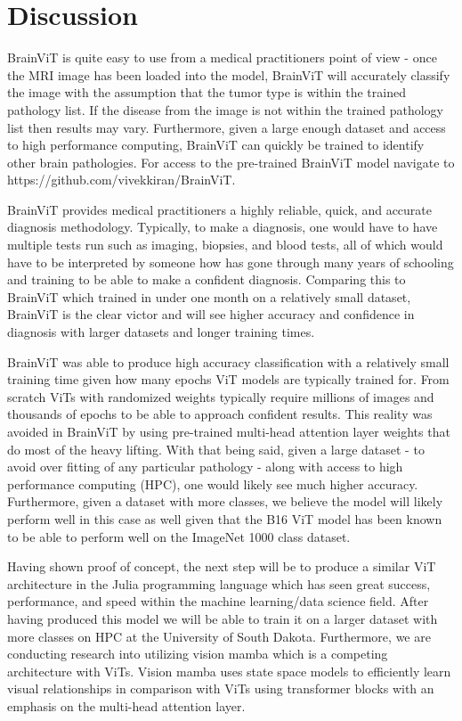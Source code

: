 \documentclass[conference]{IEEEtran}
\begin{document}
\section{Discussion}
BrainViT is quite easy to use from a medical practitioners point of view - once the MRI image has been loaded into the model, BrainViT will accurately classify the image with the assumption that the tumor type is within the trained pathology list. If the disease from the image is not within the trained pathology list then results may vary. Furthermore, given a large enough dataset and access to high performance computing, BrainViT can quickly be trained to identify other brain pathologies. For access to the pre-trained BrainViT model navigate to https://github.com/vivekkiran/BrainViT.

BrainViT provides medical practitioners a highly reliable, quick, and accurate diagnosis methodology. Typically, to make a diagnosis, one would have to have multiple tests run such as imaging, biopsies, and blood tests, all of which would have to be interpreted by someone how has gone through many years of schooling and training to be able to make a confident diagnosis. Comparing this to BrainViT which trained in under one month on a relatively small dataset, BrainViT is the clear victor and will see higher accuracy and confidence in diagnosis with larger datasets and longer training times.

BrainViT was able to produce high accuracy classification with a relatively small training time given how many epochs ViT models are typically trained for. From scratch ViTs with randomized weights typically require millions of images and thousands of epochs to be able to approach confident results. This reality was avoided in BrainViT by using pre-trained multi-head attention layer weights that do most of the heavy lifting. With that being said, given a large dataset - to avoid over fitting of any particular pathology - along with access to high performance computing (HPC), one would likely see much higher accuracy. Furthermore, given a dataset with more classes, we believe the model will likely perform well in this case as well given that the B16 ViT model has been known to be able to perform well on the ImageNet 1000 class dataset.

Having shown proof of concept, the next step will be to produce a similar ViT architecture in the Julia programming language which has seen great success, performance, and speed within the machine learning/data science field. After having produced this model we will be able to train it on a larger dataset with more classes on HPC at the University of South Dakota. Furthermore, we are conducting research into utilizing vision mamba which is a competing architecture with ViTs. Vision mamba uses state space models to efficiently learn visual relationships in comparison with ViTs using transformer blocks with an emphasis on the multi-head attention layer.
\end{document}
